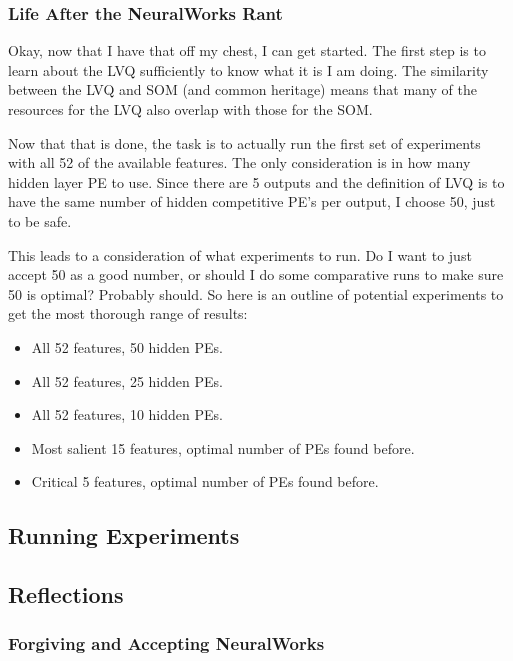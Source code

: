 \documentclass[12pt]{article}
\begin{document}
\subsubsection{Life After the NeuralWorks Rant}

Okay, now that I have that off my chest, I can get started.  The first step is to learn about the LVQ sufficiently to know what it is I am doing.  The similarity between the LVQ and SOM (and common heritage) means that many of the resources for the LVQ also overlap with those for the SOM.  

Now that that is done, the task is to actually run the first set of experiments with all 52 of the available features.  The only consideration is in how many hidden layer PE to use.  Since there are 5 outputs and the definition of LVQ is to have the same number of hidden competitive PE's per output, I choose 50, just to be safe.  

This leads to a consideration of what experiments to run.  Do I want to just accept 50 as a good number, or should I do some comparative runs to make sure 50 is optimal?  Probably should.  So here is an outline of potential experiments to get the most thorough range of results:

\begin{itemize}

\item All 52 features, 50 hidden PEs.
\item All 52 features, 25 hidden PEs.
\item All 52 features, 10 hidden PEs.
\item Most salient 15 features, optimal number of PEs found before.
\item Critical 5 features, optimal number of PEs found before.

\end{itemize}

\subsection{Running Experiments}



\subsection{Reflections}

\subsubsection{Forgiving and Accepting NeuralWorks}
\end{document}
